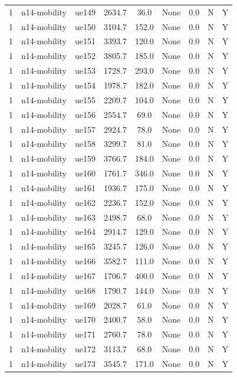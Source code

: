 \begin{table}[ht]
\begin{tabular}{|c|c|c|c|c|c|c|c|c|}
1 & n14-mobility & ue149 & 2634.7 & 36.0 & None & 0.0 & N & Y \\
1 & n14-mobility & ue150 & 3104.7 & 152.0 & None & 0.0 & N & Y \\
1 & n14-mobility & ue151 & 3393.7 & 120.0 & None & 0.0 & N & Y \\
1 & n14-mobility & ue152 & 3805.7 & 185.0 & None & 0.0 & N & Y \\
1 & n14-mobility & ue153 & 1728.7 & 293.0 & None & 0.0 & N & Y \\
1 & n14-mobility & ue154 & 1978.7 & 182.0 & None & 0.0 & N & Y \\
1 & n14-mobility & ue155 & 2209.7 & 104.0 & None & 0.0 & N & Y \\
1 & n14-mobility & ue156 & 2554.7 & 69.0 & None & 0.0 & N & Y \\
1 & n14-mobility & ue157 & 2924.7 & 78.0 & None & 0.0 & N & Y \\
1 & n14-mobility & ue158 & 3299.7 & 81.0 & None & 0.0 & N & Y \\
1 & n14-mobility & ue159 & 3766.7 & 184.0 & None & 0.0 & N & Y \\
1 & n14-mobility & ue160 & 1761.7 & 346.0 & None & 0.0 & N & Y \\
1 & n14-mobility & ue161 & 1936.7 & 175.0 & None & 0.0 & N & Y \\
1 & n14-mobility & ue162 & 2236.7 & 152.0 & None & 0.0 & N & Y \\
1 & n14-mobility & ue163 & 2498.7 & 68.0 & None & 0.0 & N & Y \\
1 & n14-mobility & ue164 & 2914.7 & 129.0 & None & 0.0 & N & Y \\
1 & n14-mobility & ue165 & 3245.7 & 126.0 & None & 0.0 & N & Y \\
1 & n14-mobility & ue166 & 3582.7 & 111.0 & None & 0.0 & N & Y \\
1 & n14-mobility & ue167 & 1706.7 & 400.0 & None & 0.0 & N & Y \\
1 & n14-mobility & ue168 & 1790.7 & 144.0 & None & 0.0 & N & Y \\
1 & n14-mobility & ue169 & 2028.7 & 61.0 & None & 0.0 & N & Y \\
1 & n14-mobility & ue170 & 2400.7 & 58.0 & None & 0.0 & N & Y \\
1 & n14-mobility & ue171 & 2760.7 & 78.0 & None & 0.0 & N & Y \\
1 & n14-mobility & ue172 & 3113.7 & 68.0 & None & 0.0 & N & Y \\
1 & n14-mobility & ue173 & 3545.7 & 171.0 & None & 0.0 & N & Y \\

\end{tabular}
\end{table}
